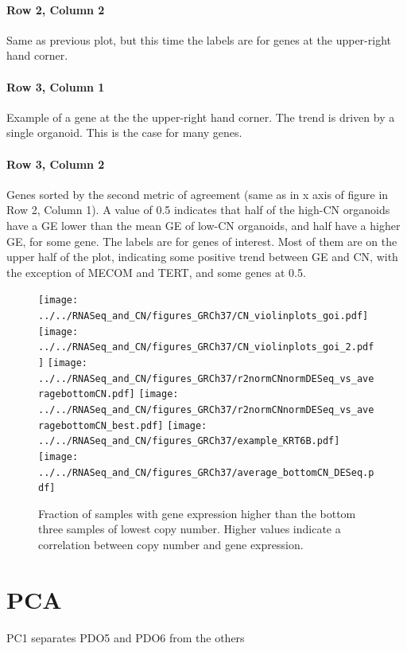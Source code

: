 \documentclass{article}
\begin{document}
\paragraph{Row 2, Column 2} Same as previous plot, but this time the labels are for genes at the upper-right hand corner.

\paragraph{Row 3, Column 1} Example of a gene at the the upper-right hand corner. The trend is driven by a single organoid. This is the case for many genes.

\paragraph{Row 3, Column 2} Genes sorted by the second metric of agreement (same as in x axis of figure in Row 2, Column 1). A value of 0.5 indicates that half of the high-CN organoids have a GE lower than the mean GE of low-CN organoids, and half have a higher GE, for some gene. The labels are for genes of interest. Most of them are on the upper half of the plot, indicating some positive trend between GE and CN, with the exception of MECOM and TERT, and some genes at 0.5.

\begin{figure}[h]
\centering
\texttt{[image: ../../RNASeq\_and\_CN/figures\_GRCh37/CN\_violinplots\_goi.pdf]}
\texttt{[image: ../../RNASeq\_and\_CN/figures\_GRCh37/CN\_violinplots\_goi\_2.pdf]}
\texttt{[image: ../../RNASeq\_and\_CN/figures\_GRCh37/r2normCNnormDESeq\_vs\_averagebottomCN.pdf]}
\texttt{[image: ../../RNASeq\_and\_CN/figures\_GRCh37/r2normCNnormDESeq\_vs\_averagebottomCN\_best.pdf]}
\texttt{[image: ../../RNASeq\_and\_CN/figures\_GRCh37/example\_KRT6B.pdf]}
\texttt{[image: ../../RNASeq\_and\_CN/figures\_GRCh37/average\_bottomCN\_DESeq.pdf]}
\caption{Fraction of samples with gene expression higher than the bottom three samples of lowest copy number. Higher values indicate a correlation between copy number and gene expression.\label{cn_ge_specific_genes}}
\end{figure}

\clearpage

\section{PCA}
PC1 separates PDO5 and PDO6 from the others
\end{document}
